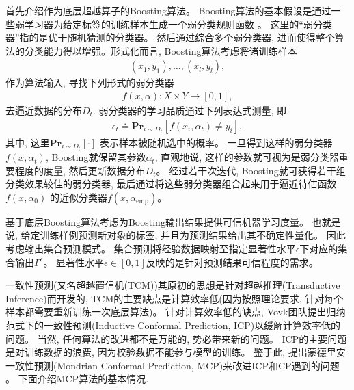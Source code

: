 首先介绍作为底层超越算子的Boosting算法。 Boosting算法的基本假设是通过一些弱学习器为给定标签的训练样本生成一个弱分类规则函数 \citep{Boosting2012}。 这里的“弱分类器”指的是优于随机猜测的分类器。 然后通过综合多个弱分类器, 进而使得整个算法的分类能力得以增强。形式化而言, Boosting算法考虑将诸训练样本
\begin{align}
(x_{1}, y_{1}), \ldots, (x_{l}, y_{l}),
\end{align}
作为算法输入, 寻找下列形式的弱分类器
\begin{align}
f(x, \alpha) : X \times Y \rightarrow [0, 1],
\end{align}
去逼近数据的分布$D_{t}$. 弱分类器的学习品质通过下列表达式测量, 即
\begin{align}
\epsilon_{t} \doteq \mathbf{Pr}_{i \sim D_{t}}[f(x_{i},\alpha_{t}) \neq y_{i}],
\end{align}
其中, 这里$\mathbf{Pr}_{i \sim D_{t}}[\cdot]$ 表示样本被随机选中的概率。 一旦得到这样的弱分类器$f(x, \alpha_{t})$, Boosting就保留其参数$\alpha_{t}$, 直观地说, 这样的参数就可视为是弱分类器重要程度的度量, 然后更新数据分布$D_{t}$。 经过若干次迭代, Boosting就可获得若干组分类效果较佳的弱分类器, 最后通过将这些弱分类器组合起来用于逼近待估函数$f(x,\alpha_{0})$ 的近似分类器$f(x, \alpha_{\text{emp}})$。

基于底层Boosting算法考虑为Boosting输出结果提供可信机器学习度量。 也就是说, 给定训练样例预测新对象的标签, 并且为预测结果给出其不确定性量化。 因此考虑输出集合预测模式。 集合预测将经验数据映射至指定显著性水平$\epsilon$下对应的集合输出$\Gamma^{\epsilon}$。 显著性水平$\epsilon \in [0,1]$反映的是针对预测结果可信程度的需求。

一致性预测(又名超越置信机(TCM)\citep{Vovk-Mondrian-2003})其原初的思想是针对超越推理(Transductive Inference)而开发的, TCM的主要缺点是计算效率低(因为按照理论要求, 针对每个样本都需要重新训练一次底层算法)\citep{2006Hedging}。 针对计算效率低的缺点, Vovk团队提出归纳范式下的一致性预测(Inductive Conformal Prediction, ICP)\citep{Papadopoulos2007}以缓解计算效率低的问题。 当然, 任何算法的改进都不是万能的, 势必带来新的问题。 ICP的主要问题是对训练数据的浪费, 因为校验数据不能参与模型的训练。 鉴于此, 提出蒙德里安一致性预测(Mondrian Conformal Prediction, MCP)来改进ICP和CP遇到的问题 \citep{vovk2005algorithmic}。 下面介绍MCP算法的基本情况. 

